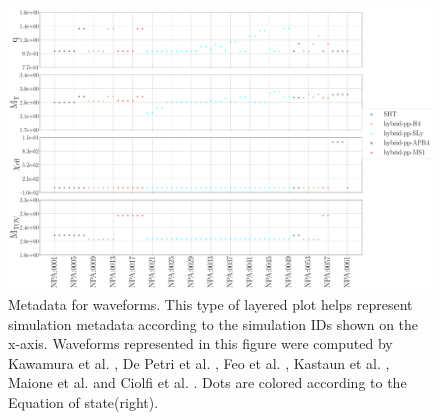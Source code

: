 \begin{figure}[hbt!]
\begin{center}
\includegraphics[width=\textwidth, angle=0]{images/Data_analysis/results/LAL_cat.pdf} 
\captionsetup{width=0.8\textwidth}
\caption[Metadata coming from other waveforms outside the CoRe catalog]{Metadata for waveforms. This type of layered plot helps represent simulation metadata according to the simulation IDs shown on the x-axis. Waveforms represented in this figure were computed by Kawamura et al. \cite{Kawamura:2016nmk}, De Petri et al. \cite{DePietri:2018tpx,DePietri:2015lya}, Feo et al. \cite{Feo:2016cbs}, Kastaun et al. \cite{Kastaun:2016elu}, Maione et al. \cite{Maione:2016zqz,Maione:2017aux} and Ciolfi et al. \cite{Ciolfi:2017uak}. Dots are colored according to the Equation of state(right).}
\end{center}
\label{lalcat}
\end{figure}

\FloatBarrier


